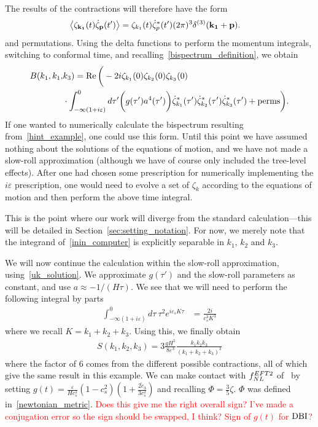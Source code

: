 The results of the contractions will therefore have the form
\begin{align}
    \left<\zeta_{\mathbf{k_1}}(t)\dot{\zeta}_{\mathbf{p}}(t')\right>
    &= \zeta_{k_1}(t)\dot{\zeta}^*_{p}(t')(2\pi)^3\delta^{(3)}(\mathbf{k_1}+\mathbf{p}).
\end{align}
and permutations.
Using the delta functions to perform the momentum integrals,
switching to conformal time,
and recalling~\eqref{bispectrum_definition}, we obtain
\begin{align}\label{inin_computer}
    B(k_1, k_1,&k_3)
    =
    \operatorname{Re}\bigg(-2i \zeta_{k_1}(0)\zeta_{k_2}(0)\zeta_{k_3}(0)\nonumber\\
    &\cdot\int_{-\infty(1+i\varepsilon)}^{0}d\tau'\bigg(g(\tau') a^4(\tau')\bigg)
    \dot{\zeta}^*_{k_1}(\tau')
    \dot{\zeta}^*_{k_2}(\tau')
    \dot{\zeta}^*_{k_3}(\tau')
    +\text{perms}
    \bigg).
\end{align}
If one wanted to numerically calculate the bispectrum resulting from~\eqref{hint_example},
one could use this form. Until this point we have assumed nothing about the solutions of the
equations of motion, and we have not made a slow-roll approximation (although we have
of course only included the tree-level effects).
After one had chosen some prescription for numerically implementing the
$i\varepsilon$ prescription, one would need to evolve a set of $\zeta_{k}$
according to the equations of motion and then perform the above time integral.


This is the point where our work will diverge from the standard calculation---this
will be detailed in Section~\ref{sec:setting_notation}. For now, we merely note that
the integrand of~\eqref{inin_computer} is explicitly separable in $k_1$, $k_2$ and $k_3$.


We will now continue the calculation within the slow-roll approximation,
using~\eqref{uk_solution}. We approximate $g(\tau')$ and the slow-roll
parameters as constant, and use $a\approx-1/(H\tau)$.
We see that we will need to perform the following integral by parts
\begin{align}\label{ieps_integral}
    \int_{-\infty(1+i\varepsilon)}^{0}d\tau~\tau^2 e^{ic_sK\tau}
    &= \frac{2i}{c_s^3K^3}
\end{align}
where we recall $K=k_1+k_2+k_3$.
Using this, we finally obtain
\begin{align}
    S(k_1, k_2, k_3) = 3\frac{g H^5}{8\varepsilon^3}\frac{k_1k_2k_3}{(k_1+k_2+k_3)^3}
\end{align}
where the factor of $6$ comes from the different possible contractions, all
of which give the same result in this example.
We can make contact with $f_{NL}^{EFT2}$ of~\cite{Planck_NG_2018, Senatore_wmap_2009}
by setting $g(t)=\frac{\varepsilon}{Hc_s^2}(1-c_s^2)\left(1+\frac{2\tilde{c}_3}{3c_s^2}\right)$
and recalling $\Phi=\frac{3}{5}\zeta$.
$\Phi$ was defined in~\eqref{newtonian_metric}.
\textcolor{red}{Does this give me the right overall sign? I've made a conjugation error
so the sign should be swapped, I think? Sign of $g(t)$ for $\text{DBI}$?}


